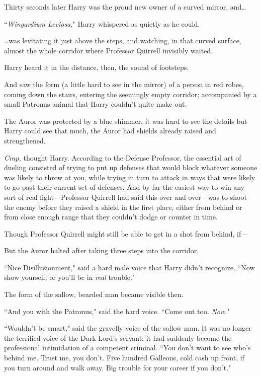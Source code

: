 Thirty seconds later Harry was the proud new owner of a curved mirror, and{\ldots}

``\emph{Wingardium Leviosa,}" Harry whispered as quietly as he could.

{\ldots}was levitating it just above the steps, and watching, in that curved surface, almost the whole corridor where Professor Quirrell invisibly waited.

Harry heard it in the distance, then, the sound of footsteps.

And saw the form (a little hard to see in the mirror) of a person in red robes, coming down the stairs, entering the seemingly empty corridor; accompanied by a small Patronus animal that Harry couldn't quite make out.

The Auror was protected by a blue shimmer, it was hard to see the details but Harry could see that much, the Auror had shields already raised and strengthened.

\emph{Crap,} thought Harry. According to the Defense Professor, the essential art of dueling consisted of trying to put up defenses that would block whatever someone was likely to throw at you, while trying in turn to attack in ways that were likely to go past their current set of defenses. And by far the easiest way to win any sort of real fight---Professor Quirrell had said this over and over---was to shoot the enemy before they raised a shield in the first place, either from behind or from close enough range that they couldn't dodge or counter in time.

Though Professor Quirrell might still be able to get in a shot from behind, if---

But the Auror halted after taking three steps into the corridor.

``Nice Disillusionment," said a hard male voice that Harry didn't recognize. ``Now show yourself, or you'll be in \emph{real} trouble."

The form of the sallow, bearded man became visible then.

``And you with the Patronus," said the hard voice. ``Come out too. \emph{Now.}"

``Wouldn't be smart," said the gravelly voice of the sallow man. It was no longer the terrified voice of the Dark Lord's servant; it had suddenly become the professional intimidation of a competent criminal. ``You don't want to see who's behind me. Trust me, you don't. Five hundred Galleons, cold cash up front, if you turn around and walk away. Big trouble for your career if you don't."

